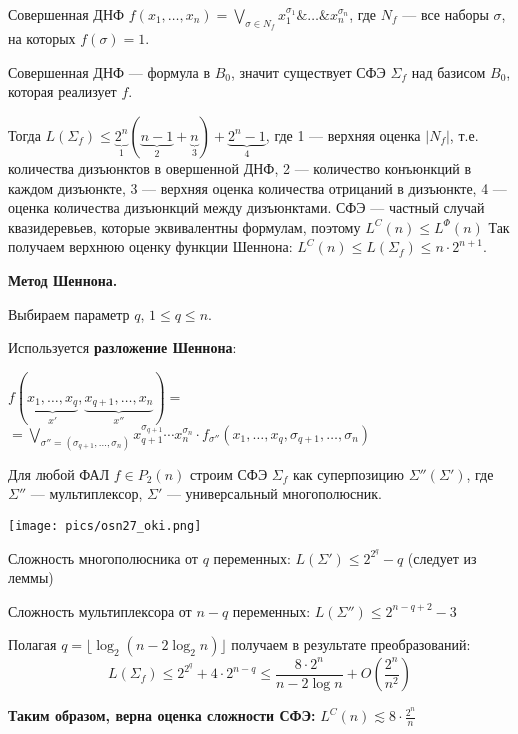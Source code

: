 Совершенная ДНФ $f(x_1,\dots,x_n) = \displaystyle\bigvee_{\sigma \in N_f} x_1^{\sigma_1} \&\dots\&x_n^{\sigma_n}$, где $N_f$ --- все наборы $\sigma$, на которых $f(\sigma) = 1$.

Совершенная ДНФ --- формула в $B_0$, значит существует СФЭ $\Sigma_f$ над базисом $B_0$, которая реализует $f$. 

Тогда 
$L(\Sigma_f) \leqslant \underbrace{2^n}_{1}(\underbrace{n - 1}_{2} + \underbrace{n}_{3} ) + \underbrace{2^n - 1}_{4}$,
где 1 --- верхняя оценка $|N_f |$, т.е. количества дизъюнктов в овершенной ДНФ, 2 --- количество конъюнкций в каждом дизъюнкте, 3 --- верхняя оценка количества отрицаний в дизъюнкте, 4 --- оценка количества дизъюнкций между дизъюнктами. СФЭ --- частный случай квазидеревьев, которые эквивалентны формулам, поэтому  $L^C(n) \leqslant L^{\Phi}(n)$
Так получаем верхнюю оценку функции Шеннона: $L^C(n) \leqslant L(\Sigma_f) \leqslant n \cdot 2^{n+1}$.

\bigbreak    
\textbf{Метод Шеннона.}
    
Выбираем параметр $q$, $1 \leqslant q \leqslant n$.

Используется \textbf{разложение Шеннона}:

$f(\underbrace{x_1,\dots,x_q}_{x'},\underbrace{x_{q+1},\dots,x_n}_{x''}) = $ \\
$= \displaystyle\bigvee_{\sigma''=(\sigma_{q+1},\dots,\sigma_n)} x_{q+1}^{\sigma_{q+1}}\cdots x_n^{\sigma_n}\cdot f_{\sigma''}(x_1,\dots,x_q,\sigma_{q+1},\dots,\sigma_n)$

Для любой ФАЛ $f \in P_2(n)$ строим СФЭ $\Sigma_f$ как суперпозицию $\Sigma''(\Sigma')$, где $\Sigma''$ --- мультиплексор, $\Sigma'$ --- универсальный многополюсник.

\texttt{[image: pics/osn27\_oki.png]}

Сложность многополюсника от $q$ переменных: $L(\Sigma') \leqslant 2^{2^q} - q $ (следует из леммы)

Сложность мультиплексора от $n-q$ переменных: $L(\Sigma'') \leqslant 2^{n - q + 2} - 3$

Полагая $q = \lfloor \log_2(n - 2\log_2 n) \rfloor$ получаем в результате преобразований: 
$$ L(\Sigma_f) \leqslant 2^{2^q} + 4\cdot 2^{n - q} \leqslant \frac{8 \cdot 2^n}{n - 2\log n} + O(\frac{2^n}{n^2}) $$

\textbf{Таким образом, верна оценка сложности СФЭ: }$L^C(n) \lesssim 8 \cdot \frac{2^n}{n}$

